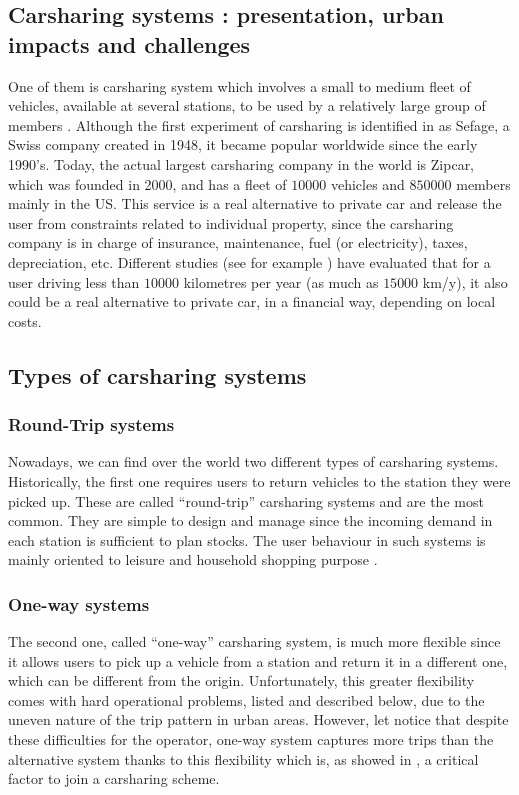 \begin{bibunit}[ieeetr]
\section{Carsharing systems : presentation, urban impacts and challenges}
One of them is carsharing system which involves a small to medium fleet of vehicles, available at several stations, to be used by a relatively large group of members \cite{shaheen_short_1999}.
Although the first experiment of carsharing is identified in \cite{shaheen_short_1999} as Sefage, a Swiss company created in 1948, it became popular worldwide since the early 1990's.
Today, the actual largest carsharing company in the world is Zipcar, which was founded in 2000, and has a fleet of $10 000$ vehicles and $850 000$ members mainly in the US. %
This service is a real alternative to private car and release the user from constraints related to individual property, since the carsharing company is in charge of insurance, maintenance, fuel (or electricity), taxes, depreciation, etc.
Different studies (see for example \cite{litman_evaluating_2000, prettenthaler_ownership_1999}) have evaluated that for a user driving less than $10 000$ kilometres per year (as much as $15 000$ km/y), it also could be a real alternative to private car, in a financial way, depending on local costs.

\subsection{Types of carsharing systems}

\subsubsection{Round-Trip systems}
Nowadays, we can find over the world two different types of carsharing systems.
Historically, the first one requires users to return vehicles to the station they were picked up.
These are called ``round-trip'' carsharing systems and are the most common.
They are simple to design and manage since the incoming demand in each station is sufficient to plan stocks.
The user behaviour in such systems is mainly oriented to leisure and household shopping purpose \cite{barth_shared_use_2002, costain_synopsis_2012}.

\subsubsection{One-way systems}
The second one, called ``one-way'' carsharing system, is much more flexible since it allows users to pick up a vehicle from a station and return it in a different one, which can be different from the origin.
Unfortunately, this greater flexibility comes with hard operational problems, listed and described below, due to the uneven nature of the trip pattern in urban areas.
However, let notice that despite these difficulties for the operator, one-way system captures more trips than the alternative system thanks to this flexibility which is, as showed in \cite{efthymiou_which_2012}, a critical factor to join a carsharing scheme.


\end{bibunit}
